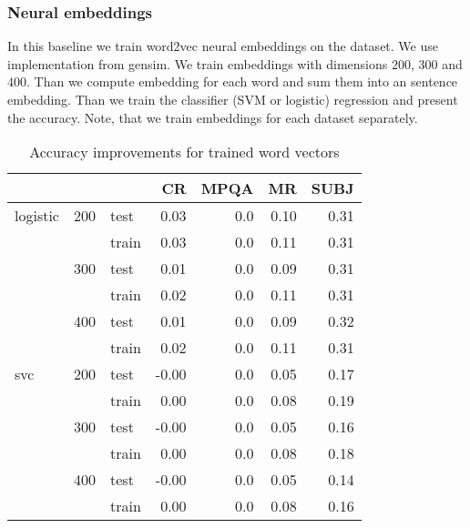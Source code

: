     \* %

    \subsubsection{Neural embeddings}
    In this baseline we train word2vec neural embeddings on the dataset. 
    We use implementation  from gensim.
    We train embeddings with dimensions $200$, $300$ and $400$. 
    Than we compute embedding for each word and sum them into an sentence embedding.
    Than we train the classifier (SVM or logistic) regression and present the accuracy.
    \* %
    Note, that we train embeddings for each dataset separately.

\begin{table}[H]
\begin{center}

\begin{tabular}{lllrrrr}
\toprule
 & &&CR &MPQA &MR &SUBJ \\
\midrule
logistic & 200 & test & 0.03 &0.0 & 0.10 & 0.31 \\
 & & train & 0.03 &0.0 & 0.11 & 0.31 \\
 & 300 & test & 0.01 &0.0 & 0.09 & 0.31 \\
 & & train & 0.02 &0.0 & 0.11 & 0.31 \\
 & 400 & test & 0.01 &0.0 & 0.09 & 0.32 \\
 & & train & 0.02 &0.0 & 0.11 & 0.31 \\
svc & 200 & test &-0.00 &0.0 & 0.05 & 0.17 \\
 & & train & 0.00 &0.0 & 0.08 & 0.19 \\
 & 300 & test &-0.00 &0.0 & 0.05 & 0.16 \\
 & & train & 0.00 &0.0 & 0.08 & 0.18 \\
 & 400 & test &-0.00 &0.0 & 0.05 & 0.14 \\
 & & train & 0.00 &0.0 & 0.08 & 0.16 \\
\bottomrule
\end{tabular}


\caption[Accuracy improvements for trained word vectors]{Accuracy improvements for trained word vectors}
\label{tab:res:trainedwordvec}
\end{center}
\end{table}

